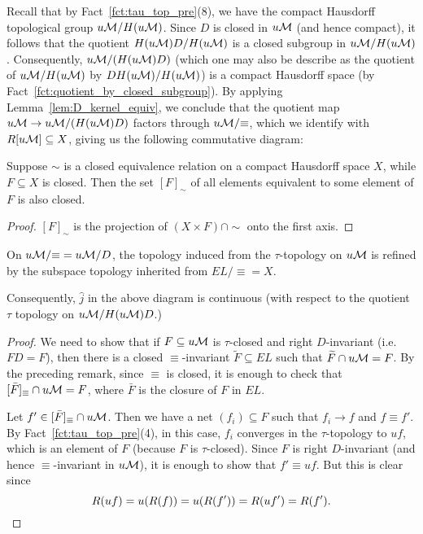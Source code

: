 	Recall that by Fact~\ref{fct:tau_top_pre}(8), we have the compact Hausdorff topological group $u{\mathcal M}/H(u{\mathcal M})$. Since $D$ is closed in $u{\mathcal M}$ (and hence compact), it follows that the quotient $H(u{\mathcal M})D/H(u{\mathcal M})$ is a closed subgroup in $u{\mathcal M}/H(u{\mathcal M})$. Consequently, $u{\mathcal M}/(H(u{\mathcal M})D)$ (which one may also be describe as the quotient of $u{\mathcal M}/H(u{\mathcal M})$ by $DH(u{\mathcal M})/H(u{\mathcal M})$) is a compact Hausdorff space (by Fact~\ref{fct:quotient_by_closed_subgroup}). By applying Lemma~\ref{lem:D_kernel_equiv}, we conclude that the quotient map $u{\mathcal M}\to u{\mathcal M}/(H(u{\mathcal M})D)$ factors through $u{\mathcal M}/{\equiv}$, which we identify with $R[u{\mathcal M}]\subseteq X$, giving us the following commutative diagram:
	\begin{center}
	\end{center}
	
	\begin{prop}
		Suppose $\sim$ is a closed equivalence relation on a compact Hausdorff space $X$, while $F\subseteq X$ is closed. Then the set $[F]_\sim$ of all elements equivalent to some element of $F$ is also closed.\xqed{\lozenge}
	\end{prop}
	\begin{proof}
		$[F]_\sim$ is the projection of $(X\times F)\cap {\sim}$ onto the first axis.
	\end{proof}
	
	\begin{lem}
		\label{lem:jhat_cont}
		On $u{\mathcal M}/{\equiv}=u{\mathcal M}/D$, the topology induced from the $\tau$-topology on $u{\mathcal M}$ is refined by the subspace topology inherited from $EL/{\equiv}=X$.
		
		Consequently, $\widehat j$ in the above diagram is continuous (with respect to the quotient $\tau$ topology on $u{\mathcal M}/H(u{\mathcal M})D$.)
	\end{lem}
	\begin{proof}
		We need to show that if $F\subseteq u{\mathcal M}$ is $\tau$-closed and right $D$-invariant (i.e.\ $FD=F$), then there is a closed $\equiv$-invariant $\widetilde F\subseteq EL$ such that $\widetilde F\cap u{\mathcal M}=F$. By the preceding remark, since $\equiv$ is closed, it is enough to check that $[\bar F]_{\equiv}\cap u{\mathcal M}=F$, where $\bar F$ is the closure of $F$ in $EL$.
		
		Let $f'\in [\bar F]_{\equiv}\cap u{\mathcal M}$. Then we have a net $(f_i)\subseteq F$ such that $f_i\to f$ and $f\equiv f'$. By Fact~\ref{fct:tau_top_pre}(4), in this case, $f_i$ converges in the $\tau$-topology to $uf$, which is an element of $F$ (because $F$ is $\tau$-closed). Since $F$ is right $D$-invariant (and hence $\equiv$-invariant in $u{\mathcal M}$), it is enough to show that $f'\equiv uf$. But this is clear since
		\[
		R(uf)=u(R(f))=u(R(f'))=R(uf')=R(f').\qedhere
		\]
	\end{proof}
	
